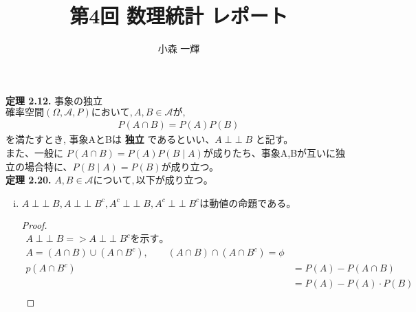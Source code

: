 \documentclass[dvipdfmx,10pt, a4j]{jarticle}
\title{第4回 数理統計 レポート}
\author{小森 一輝}
\newcommand{\indepe}{\mathop{\perp\!\!\!\perp}}
\theoremstyle{definition}
\begin{document}
    \maketitle

    \setcounter{section}{2}
    \noindent
    \textbf{定理 2.12.} 事象の独立\\
    $確率空間(\Omega, \mathcal{A}, P) において, A, B \in \mathcal{A}が,$\\
    \begin{align*}
        P(A \cap B) = P(A)P(B)
    \end{align*}
    を満たすとき, 事象AとBは \textbf{独立} であるといい、$A \indepe B$ と記す。\\
    また、一般に $P(A \cap B) = P(A)P(B \mid A)$が成りたち、事象A,Bが互いに独立の場合特に、$P(B \mid A) = P(B)$が成り立つ。\\

    \noindent
    \textbf{定理 2.20.} $A, B \in \mathcal{A} について,以下が成り立つ。$\\
    \begin{enumerate}[i)]
        \item $A \indepe B, A \indepe B^{c}, A^{c} \indepe B, A^{c} \indepe B^{c} は動値の命題である。$
        \begin{proof}
            \begin{align*}
                A \indepe B => A \indepe B^{c} を示す。\\
                A = (A \cap B) \cup (A \cap B^{c}), \qquad (A \cap B) \cap (A \cap B^{c}) = \phi\\
                p(A \cap B^{c}) &= P(A) - P(A \cap B)\\
                &= P(A) - P(A) \cdot P(B)\\
            \end{align*}
        \end{proof}
    \end{enumerate}
\end{document}
